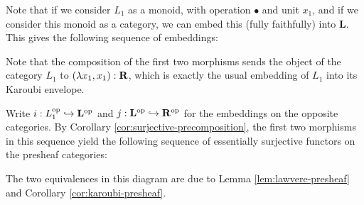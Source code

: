 Note that if we consider $ L_1 $ as a monoid, with operation $ \bullet $ and unit $ x_1 $, and if we consider this monoid as a category, we can embed this (fully faithfully) into $ \mathbf L $. This gives the following sequence of embeddings:
\begin{center}
\end{center}

Note that the composition of the first two morphisms sends the object of the category $ L_1 $ to $ (\lambda x_1, x_1) : \mathbf{R} $, which is exactly the usual embedding of $ L_1 $ into its Karoubi envelope.

Write $ i: L_1^{\text{op}} \hookrightarrow \mathbf L^{\text{op}} $ and $ j: \mathbf L^{\text{op}} \hookrightarrow \mathbf{R}^{\text{op}} $ for the embeddings on the opposite categories. By Corollary \ref{cor:surjective-precomposition}, the first two morphisms in this sequence yield the following sequence of essentially surjective functors on the presheaf categories:
\begin{center}
\end{center}
The two equivalences in this diagram are due to Lemma \ref{lem:lawvere-presheaf} and Corollary \ref{cor:karoubi-presheaf}.

